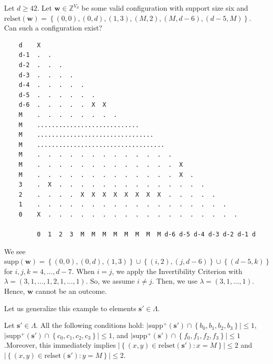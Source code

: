 \begin{example}\label{ex:siuh438h89}
    Let \( d \geq 42 \). Let \( \mathbf{w} \in \mathbb{Z}^{V_d} \) be some valid configuration with support size six and \( \mathrm{relset}(\mathbf{w}) = \left\{ (0,0), (0,d), (1,3), (M,2), (M, d-6), (d-5, M) \right\} \). Can such a configuration exist?
    \begin{small}
    \begin{verbatim}
    d    X
    d-1  .  .
    d-2  .  .  .
    d-3  .  .  .  .
    d-4  .  .  .  .  .
    d-5  .  .  .  .  .  .
    d-6  .  .  .  .  .  X  X
    M    .  .  .  .  .  .  .  .
    M    ............................
    M    ................................
    M    ...................................
    M    .  .  .  .  .  .  .  .  .  .  .  .  . 
    M    .  .  .  .  .  .  .  .  .  .  .  .  .  X
    M    .  .  .  .  .  .  .  .  .  .  .  .  .  X  .   
    3    .  X  .  .  .  .  .  .  .  .  .  .  .  .  .  .
    2    .  .  .  .  X  X  X  X  X  X  X  X  .  .  .  .  .     
    1    .  .  .  .  .  .  .  .  .  .  .  .  .  .  .  .  .  .
    0    X  .  .  .  .  .  .  .  .  .  .  .  .  .  .  .  .  .  .

         0  1  2  3  M  M  M  M  M  M  M  M d-6 d-5 d-4 d-3 d-2 d-1 d
    \end{verbatim}
    \end{small}
    We see \( \mathrm{supp}(\mathbf{w}) = \left\{ (0,0), (0,d), (1,3) \right\} \cup \left\{ (i,2), (j,d-6 ) \right\} \cup \left\{ (d-5,k ) \right\} \)
    for \( i,j,k  = 4, \dots, d-7 \). When \( i = j \), we apply the Invertibility Criterion with \( \lambda = (3,1, \dots,1, 2, 1, \dots, 1) \). So, we assume \( i \neq j \). Then, we use \( \lambda = (3, 1, \dots, 1) \). Hence, \( \mathbf{w} \) cannot be an outcome.
\end{example}

Let us generalize this example to elements \(  \mathbf{s}' \in \Lambda \).

\begin{proposition}
    Let \( \mathbf{s}' \in \Lambda \). All the following conditions hold: \( \lvert \mathrm{supp}^+(\mathbf{s}') \cap \left\{ b_0,b_1,b_2,b_3 \right\} \rvert \leq 1 \), \( \lvert \mathrm{supp}^+(\mathbf{s}') \cap \left\{ c_0,c_1,c_2,c_3 \right\} \rvert \leq 1 \), and \( \lvert \mathrm{supp}^+(\mathbf{s}') \cap \left\{ f_0,f_1,f_2,f_3 \right\} \rvert \leq 1 \).Moreover, this immediately implies \( \lvert \left\{ (x,y) \in \mathrm{relset}(\mathbf{s}') : x = M \right\} \rvert \leq 2 \) and \(  \lvert \left\{ (x,y) \in \mathrm{relset}(\mathbf{s}') : y = M \right\} \rvert \leq 2 \).
\end{proposition}

